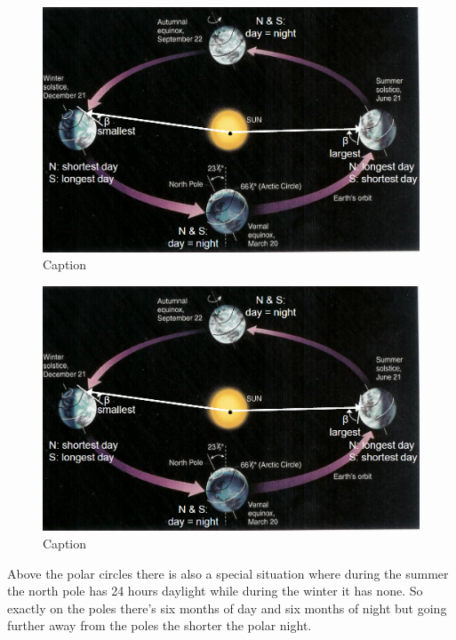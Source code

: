 \documentclass[12pt,oneside]{book}
\begin{document}
\begin{figure}

{\centering \includegraphics[width=1\linewidth]{figures/Figure24} 

}

\caption{Caption}\label{fig:Seasons4}
\end{figure}

\begin{figure}

{\centering \includegraphics[width=1\linewidth]{figures/Figure25} 

}

\caption{Caption}\label{fig:Seasons5}
\end{figure}

Above the polar circles there is also a special situation where during
the summer the north pole has 24 hours daylight while during the winter
it has none. So exactly on the poles there's six months of day and six
months of night but going further away from the poles the shorter the
polar night.
\end{document}
